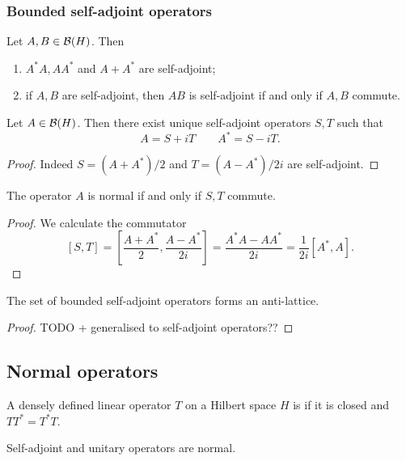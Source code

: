 \subsubsection{Bounded self-adjoint operators}
\begin{lemma}
Let $A, B\in\operatorname{\mathcal{B}}(H)$. Then
\begin{enumerate}
\item $A^*A, AA^*$ and $A+A^*$ are self-adjoint;
\item if $A,B$ are self-adjoint, then $AB$ is self-adjoint \textup{if and only if} $A,B$ commute.
\end{enumerate}
\end{lemma}
\begin{corollary}
Let $A\in\operatorname{\mathcal{B}}(H)$. Then there exist unique self-adjoint operators $S,T$ such that
\[ A = S+iT \qquad A^* = S-iT. \]
\end{corollary}
\begin{proof}
Indeed $S = (A+A^*)/2$ and $T = (A-A^*)/2i$ are self-adjoint.
\end{proof}
\begin{corollary}
The operator $A$ is normal \textup{if and only if} $S,T$ commute.
\end{corollary}
\begin{proof}
We calculate the commutator
\[ [S,T] = \left[\frac{A+A^*}{2}, \frac{A-A^*}{2i}\right] = \frac{A^*A - AA^*}{2i} = \frac{1}{2i}[A^*, A]. \]
\end{proof}

\begin{proposition}
The set of bounded self-adjoint operators forms an anti-lattice.
\end{proposition}
\begin{proof}
TODO + generalised to self-adjoint operators??
\end{proof}

\subsection{Normal operators}
\begin{definition}
A densely defined linear operator $T$ on a Hilbert space $H$ is  if it is closed and $TT^* = T^*T$.
\end{definition}
Self-adjoint and unitary operators are normal.

